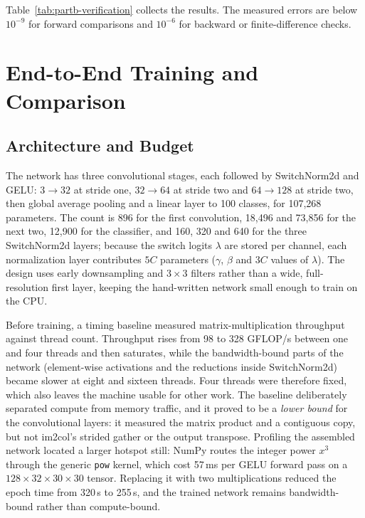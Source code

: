 \documentclass[10pt]{article}
\begin{document}
Table~\ref{tab:partb-verification} collects the results. The measured errors are below $10^{-9}$
for forward comparisons and $10^{-6}$ for backward or finite-difference checks.

\section{End-to-End Training and Comparison}
\label{sec:partb-training}

\subsection{Architecture and Budget}

The network has three convolutional stages, each followed by SwitchNorm2d and GELU:
$3\!\to\!32$ at stride one, $32\!\to\!64$ at stride two and $64\!\to\!128$ at stride two, then global
average pooling and a linear layer to 100 classes, for 107{,}268 parameters. The count is 896 for the first convolution, 18{,}496 and 73{,}856 for the next two, 12{,}900 for the classifier, and 160, 320 and 640 for the three SwitchNorm2d layers; because the switch logits $\lambda$ are stored per channel, each normalization layer contributes $5C$ parameters ($\gamma$, $\beta$ and $3C$ values of $\lambda$). The design uses early downsampling and $3\times3$ filters rather than a wide,
full-resolution first layer, keeping the hand-written network small enough to train on the CPU.

Before training, a timing baseline measured matrix-multiplication throughput against thread count.
Throughput rises from 98 to 328 GFLOP/s between one and four threads and then saturates, while the
bandwidth-bound parts of the network (element-wise activations and the reductions inside
SwitchNorm2d) became slower at eight and sixteen threads. Four threads were therefore fixed, which
also leaves the machine usable for other work. The baseline deliberately separated compute from
memory traffic, and it proved to be a \emph{lower bound} for the convolutional layers: it measured
the matrix product and a contiguous copy, but not im2col's strided gather or the output transpose.
Profiling the assembled network located a larger hotspot still: NumPy routes the integer power
$x^3$ through the generic \texttt{pow} kernel, which cost 57\,ms per GELU forward pass on a
$128\times32\times30\times30$ tensor. Replacing it with two multiplications reduced the epoch time
from 320\,s to 255\,s, and the trained network remains bandwidth-bound rather than compute-bound.
\end{document}
